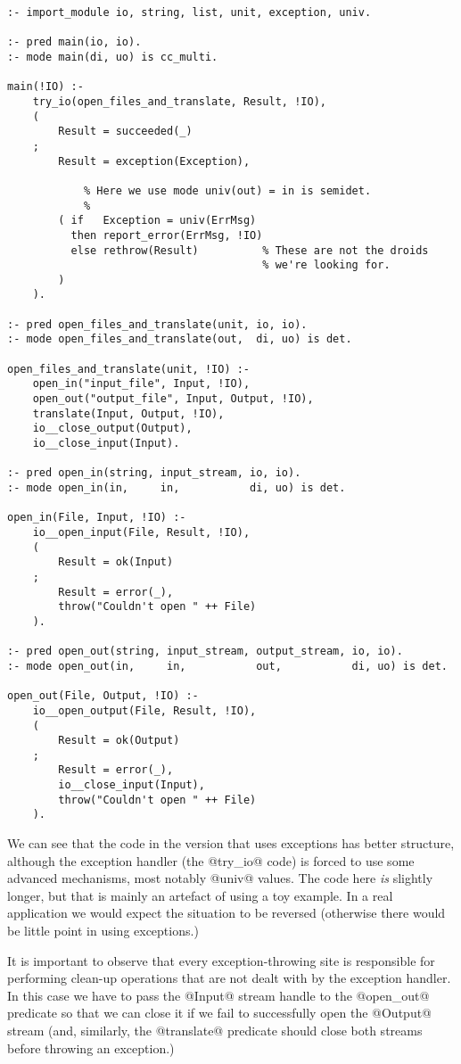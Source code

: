 \begin{verbatim}
:- import_module io, string, list, unit, exception, univ.

:- pred main(io, io).
:- mode main(di, uo) is cc_multi.

main(!IO) :-
    try_io(open_files_and_translate, Result, !IO),
    (
        Result = succeeded(_)
    ;
        Result = exception(Exception),

            % Here we use mode univ(out) = in is semidet.
            %
        ( if   Exception = univ(ErrMsg)
          then report_error(ErrMsg, !IO)
          else rethrow(Result)          % These are not the droids
                                        % we're looking for.
        )
    ).

:- pred open_files_and_translate(unit, io, io).
:- mode open_files_and_translate(out,  di, uo) is det.

open_files_and_translate(unit, !IO) :-
    open_in("input_file", Input, !IO),
    open_out("output_file", Input, Output, !IO),
    translate(Input, Output, !IO),
    io__close_output(Output),
    io__close_input(Input).

:- pred open_in(string, input_stream, io, io).
:- mode open_in(in,     in,           di, uo) is det.

open_in(File, Input, !IO) :-
    io__open_input(File, Result, !IO),
    (
        Result = ok(Input)
    ;
        Result = error(_),
        throw("Couldn't open " ++ File)
    ).

:- pred open_out(string, input_stream, output_stream, io, io).
:- mode open_out(in,     in,           out,           di, uo) is det.

open_out(File, Output, !IO) :-
    io__open_output(File, Result, !IO),
    (
        Result = ok(Output)
    ;
        Result = error(_),
        io__close_input(Input),
        throw("Couldn't open " ++ File)
    ).
\end{verbatim}
We can see that the code in the version that uses exceptions has
better structure, although the exception handler (the @try_io@ code) is
forced to use some advanced mechanisms, most notably @univ@ values.  The
code here \emph{is} slightly longer, but that is mainly an artefact of
using a toy example.  In a real application we would expect the
situation to be reversed (otherwise there would be little point in using
exceptions.)

It is important to observe that every exception-throwing site is
responsible for performing clean-up operations that are not dealt with
by the exception handler.  In this case we have to pass the @Input@
stream handle to the @open_out@ predicate so that we can close it if we
fail to successfully open the @Output@ stream (and, similarly, the
@translate@ predicate should close both streams before throwing an
exception.)



